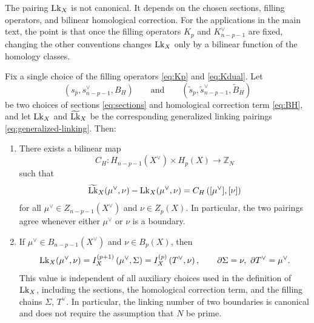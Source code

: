 The pairing \(\mathrm{Lk}_X\) is not canonical. It depends on the chosen sections,
filling operators, and bilinear homological correction. For the applications in the main
text, the point is that once the filling operators \(K_p\) and \(K^\vee_{n-p-1}\) are
fixed, changing the other conventions changes \(\mathrm{Lk}_X\) only by a bilinear
function of the homology classes.

\begin{prop}
	\label{prop:choice-dependence}
	Fix a single choice of the filling operators \eqref{eq:Kp} and \eqref{eq:Kdual}. Let
	\begin{equation}
		(s_p,s^\vee_{n-p-1},B_H)
		\qquad\text{and}\qquad
		(\widetilde s_p,\widetilde s^\vee_{n-p-1},\widetilde B_H)
	\end{equation}
	be two choices of sections \eqref{eq:sections} and homological correction term
	\eqref{eq:BH}, and let \(\mathrm{Lk}_X\) and \(\widetilde{\mathrm{Lk}}_X\) be the corresponding
	generalized linking pairings \eqref{eq:generalized-linking}. Then:
	\begin{enumerate}[label=(\roman*)]
		\item\label{prop:choice-dependence-item1}
		There exists a bilinear map
		\begin{equation}
			C_H:H_{n-p-1}(X^\vee)\times H_p(X)\to \mathbb Z_N
			\label{eq:DeltaH}
		\end{equation}
		such that
		\begin{equation}
			\widetilde{\mathrm{Lk}}_X(\mu^\vee,\nu)-\mathrm{Lk}_X(\mu^\vee,\nu)
			=
			C_H\left([\mu^\vee],[\nu]\right)
			\label{eq:choice-dependence}
		\end{equation}
		for all
		\(\mu^\vee\in Z_{n-p-1}(X^\vee)\) and \(\nu\in Z_p(X)\). In particular, the two
		pairings agree whenever either \(\mu^\vee\) or \(\nu\) is a boundary.
		
		\item\label{propItem:bdryLink}
		If \(\mu^\vee\in B_{n-p-1}(X^\vee)\) and \(\nu\in B_p(X)\), then
		\begin{equation}
			\mathrm{Lk}_X(\mu^\vee,\nu)
			=
			I_X^{(p+1)}\left(\mu^\vee,\Sigma\right)
			=
			I_X^{(p)}\left(T^\vee,\nu\right),
			\qquad
			\partial\Sigma=\nu,\ \partial T^\vee=\mu^\vee.
			\label{eq:boundary-linking-canonical-merged}
		\end{equation}
		This value is independent of all auxiliary choices used in the definition of
		\(\mathrm{Lk}_X\), including the sections, the homological correction term, and the
		filling chains \(\Sigma\), \(T^\vee\). In particular, the linking number of two
		boundaries is canonical and does not require the assumption that \(N\) be
		prime.
	\end{enumerate}
\end{prop}

